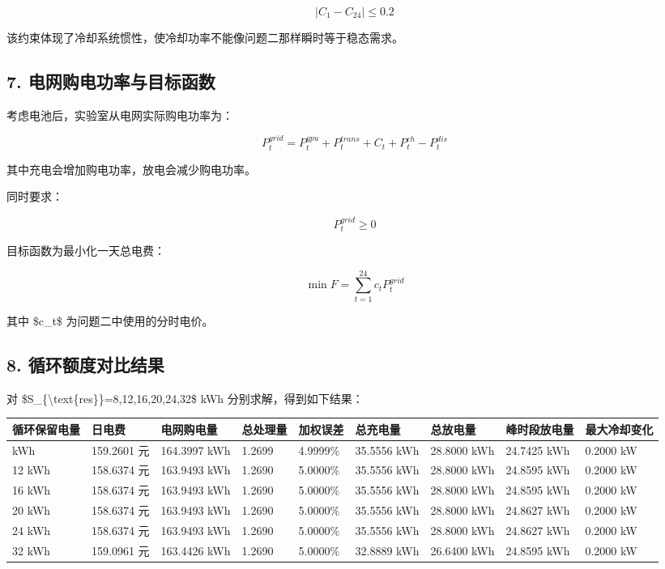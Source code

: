 \documentclass[
]{article}
\begin{document}
\[|C_1-C_{24}|\le 0.2\]

该约束体现了冷却系统惯性，使冷却功率不能像问题二那样瞬时等于稳态需求。

\subsection{7.
电网购电功率与目标函数}\label{7-ux7535ux7f51ux8d2dux7535ux529fux7387ux4e0eux76eeux6807ux51fdux6570}

考虑电池后，实验室从电网实际购电功率为：

\[P_t^{grid}=P_t^{gpu}+P_t^{trans}+C_t+P_t^{ch}-P_t^{dis}\]

其中充电会增加购电功率，放电会减少购电功率。

同时要求：

\[P_t^{grid}\ge 0\]

目标函数为最小化一天总电费：

\[\min F=\sum_{t=1}^{24}c_tP_t^{grid}\]

其中 \$c\_t\$ 为问题二中使用的分时电价。

\subsection{8.
循环额度对比结果}\label{8-ux5faaux73afux989dux5ea6ux5bf9ux6bd4ux7ed3ux679c}

对 \$S\_\{\textbackslash text\{res\}\}=8,12,16,20,24,32\$ kWh
分别求解，得到如下结果：

\begin{longtable}[]{@{}lllllllll@{}}
\toprule\noalign{}
循环保留电量 & 日电费 & 电网购电量 & 总处理量 & 加权误差 & 总充电量 &
总放电量 & 峰时段放电量 & 最大冷却变化 \\
\midrule\noalign{}
\endhead
\bottomrule\noalign{}
\endlastfoot
8 kWh & 159.2601 元 & 164.3997 kWh & 1.2699 & 4.9999\% & 35.5556 kWh &
28.8000 kWh & 24.7425 kWh & 0.2000 kW \\
12 kWh & 158.6374 元 & 163.9493 kWh & 1.2690 & 5.0000\% & 35.5556 kWh &
28.8000 kWh & 24.8595 kWh & 0.2000 kW \\
16 kWh & 158.6374 元 & 163.9493 kWh & 1.2690 & 5.0000\% & 35.5556 kWh &
28.8000 kWh & 24.8595 kWh & 0.2000 kW \\
20 kWh & 158.6374 元 & 163.9493 kWh & 1.2690 & 5.0000\% & 35.5556 kWh &
28.8000 kWh & 24.8627 kWh & 0.2000 kW \\
24 kWh & 158.6374 元 & 163.9493 kWh & 1.2690 & 5.0000\% & 35.5556 kWh &
28.8000 kWh & 24.8627 kWh & 0.2000 kW \\
32 kWh & 159.0961 元 & 163.4426 kWh & 1.2690 & 5.0000\% & 32.8889 kWh &
26.6400 kWh & 24.8595 kWh & 0.2000 kW \\
\end{longtable}
\end{document}
